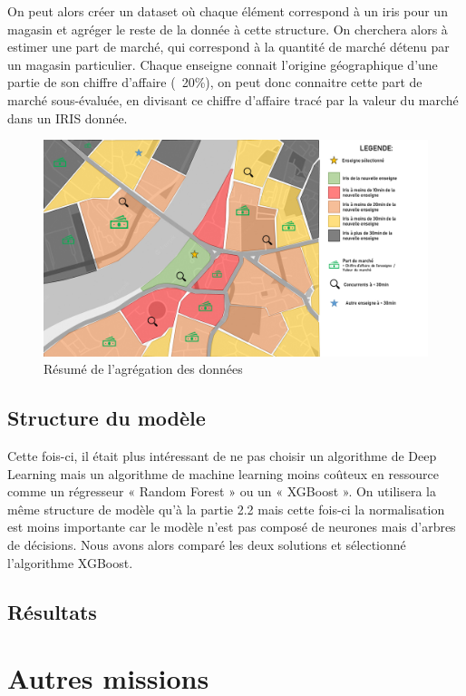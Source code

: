 On peut alors créer un dataset où chaque élément correspond à un iris pour un magasin et agréger le reste de la donnée à cette structure. On cherchera alors à estimer une part de marché, qui correspond à la quantité de marché détenu par un magasin particulier. Chaque enseigne connait l'origine géographique d'une partie de son chiffre d'affaire (~20\%), on peut donc connaitre cette part de marché sous-évaluée, en divisant ce chiffre d'affaire tracé par la valeur du marché dans un IRIS donnée.

\begin{figure}[H]
    \centering
    \includegraphics[width=\linewidth]{images/graphs/data_ca.png}
    \captionsetup{justification=centering}
    \caption{Résumé de l'agrégation des données}
    \label{fig:data_ca}
\end{figure}

\subsection{Structure du modèle}

Cette fois-ci, il était plus intéressant de ne pas choisir un algorithme de Deep Learning mais un algorithme de machine learning moins coûteux en ressource comme un régresseur « Random Forest » ou un « XGBoost ».
On utilisera la même structure de modèle qu’à la partie 2.2 mais cette fois-ci la normalisation est moins importante car le modèle n’est pas composé de neurones mais d’arbres de décisions.
Nous avons alors comparé les deux solutions et sélectionné l’algorithme XGBoost.


\subsection{Résultats}

\section{Autres missions}

